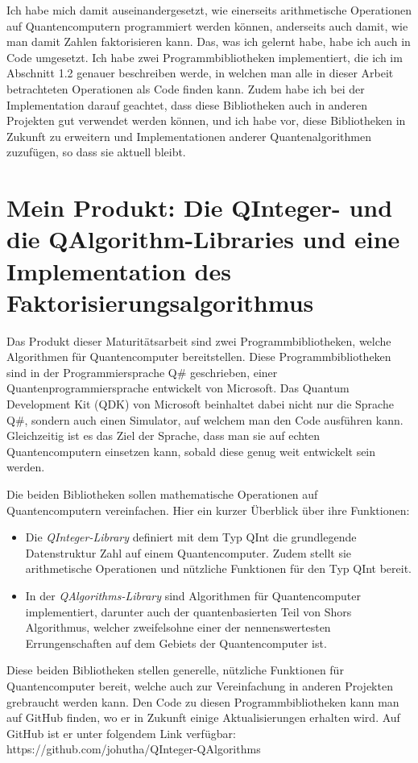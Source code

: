 Ich habe mich damit auseinandergesetzt, wie einerseits arithmetische Operationen auf Quantencomputern programmiert werden können, anderseits auch damit, wie man damit Zahlen faktorisieren kann. Das, was ich gelernt habe, habe ich auch in Code umgesetzt. Ich habe zwei Programmbibliotheken implementiert, die ich im Abschnitt 1.2 genauer beschreiben werde, in welchen man alle in dieser Arbeit betrachteten Operationen als Code finden kann. Zudem habe ich bei der Implementation darauf geachtet, dass diese Bibliotheken auch in anderen Projekten gut verwendet werden können, und ich habe vor, diese Bibliotheken in Zukunft zu erweitern und Implementationen anderer Quantenalgorithmen zuzufügen, so dass sie aktuell bleibt.

\section{Mein Produkt: Die QInteger- und die QAlgorithm-Libraries und eine Implementation des Faktorisierungsalgorithmus}
Das Produkt dieser Maturitätsarbeit sind zwei Programmbibliotheken, welche Algorithmen für Quantencomputer bereitstellen. Diese Programmbibliotheken sind in der Programmiersprache Q\# geschrieben, einer Quantenprogrammiersprache entwickelt von Microsoft. Das Quantum Development Kit (QDK) von Microsoft beinhaltet dabei nicht nur die Sprache Q\#, sondern auch einen Simulator, auf welchem man den Code ausführen kann. Gleichzeitig ist es das Ziel der Sprache, dass man sie auf echten Quantencomputern einsetzen kann, sobald diese genug weit entwickelt sein werden.

Die beiden Bibliotheken sollen mathematische Operationen auf Quantencomputern vereinfachen. Hier ein kurzer Überblick über ihre Funktionen: %
\begin{itemize}
  \item Die \textit{QInteger-Library} definiert mit dem Typ \grqq QInt\grqq{} die grundlegende Datenstruktur \grqq Zahl\grqq{} auf einem Quantencomputer. Zudem stellt sie arithmetische Operationen und nützliche Funktionen für den Typ \grqq QInt\grqq{} bereit. %
  \item In der \textit{QAlgorithms-Library} sind Algorithmen für Quantencomputer implementiert, darunter auch der quantenbasierten Teil von Shors Algorithmus, welcher zweifelsohne einer der nennenswertesten Errungenschaften auf dem Gebiets der Quantencomputer ist.
\end{itemize}
Diese beiden Bibliotheken stellen generelle, nützliche Funktionen für Quantencomputer bereit, welche auch zur Vereinfachung in anderen Projekten grebraucht werden kann. Den Code zu diesen Programmbibliotheken kann man auf GitHub finden, wo er in Zukunft einige Aktualisierungen erhalten wird. Auf GitHub ist er unter folgendem Link verfügbar: https://github.com/johutha/QInteger-QAlgorithms

